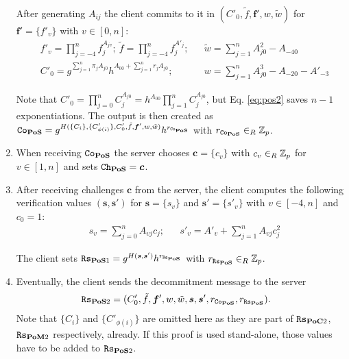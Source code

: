 \begin{enumerate}
    \noindent
    After generating $A_{ij}$ the client commits to it in $(C'_0, \tilde{f}, \bm f', w, \tilde{w})$ for $\bm f'=\{f'_v\}$ with $v\in[0,n]$:
    \begin{align}
    & f'_v=\prod_{j=-4}^{n} f_j^{A_{jv}};~ \tilde{f}=\prod_{j=-4}^{n} f_j^{A'_{j}}; && \tilde{w}=\sum_{j=1}^n A_{j0}^2 - A_{-40} \nonumber\\
    & C'_0=g^{\sum_{j=1}^{n} \pi_j A_{j0}} h^{A_{00}+\sum_{j=1}^{n} r_jA_{j0}}; && w=\sum_{j=1}^n A_{j0}^3-A_{-20}-A'_{-3} \label{eq:pos2}
    \end{align}

    \noindent
    Note that $C'_0=\prod_{j=0}^n C_j^{A_{j0}}=h^{A_{00}}\prod_{j=1}^n C_j^{A_{j0}}$, but Eq. \ref{eq:pos2} saves $n-1$ exponentiations.
    The output is then created as
    $\mathtt{Co}_\mathsf{\bf PoS}=g^{H(\{C_i\}, \{C'_{\phi(i)}\}, C'_0, \tilde{f}, \bm f', w, \tilde{w})} h^{r_{\mathtt{Co}_\mathsf{\bf PoS}}}$ with $r_{\mathtt{Co}_\mathsf{\bf PoS}}\in_R\mathbb{Z}_p$.

\item %
    When receiving $\mathtt{Co}_\mathsf{\bf PoS}$ the server chooses $\bm c = \{c_v\}$ with $c_v\in_R\mathbb{Z}_p$ for $v\in[1,n]$ and sets $\mathtt{Ch}_\mathsf{\bf PoS}=\bm c$.

\item %
    After receiving challenges $\bm c$ from the server, the client computes the following verification values $(\bm s, \bm s')$ for $\bm s = \{s_v\}$ and $\bm s' = \{s'_v\}$ with $v\in[-4,n]$ and $c_0=1$:
    \begin{align*}
     & s_v = \sum_{j=0}^{n} A_{vj}c_j; && s'_v = A'_v + \sum_{j=1}^{n} A_{vj}c_j^2
    \end{align*}

    \noindent
    The client sets $\mathtt{Rs}_{\mathsf{\bf PoS}1}=g^{H(\bm s, \bm s')} h^{r_{\mathtt{Rs}_\mathsf{\bf PoS}}}$ with $r_{\mathtt{Rs}_\mathsf{\bf PoS}}\in_R\mathbb{Z}_p$.

\item %
    Eventually, the client sends the decommitment message to the server
    \begin{align*}
      & \mathtt{Rs}_{\mathsf{\bf PoS}2}=(C'_0, \tilde{f}, \bm f', w, \tilde{w}, \bm s, \bm s', r_{\mathtt{Co}_\mathsf{\bf PoS}}, r_{\mathtt{Rs}_\mathsf{\bf PoS}}).
    \end{align*}
    Note that $\{C_i\}$ and $\{C'_{\phi(i)}\}$ are omitted here as they are part of $\mathtt{Rs}_{\mathsf{\bf PoC}2}$, $\mathtt{Rs}_{\mathsf{\bf PoM}2}$ respectively, already.
    If this proof is used stand-alone, those values have to be added to $\mathtt{Rs}_{\mathsf{\bf PoS}2}$.

\end{enumerate}

